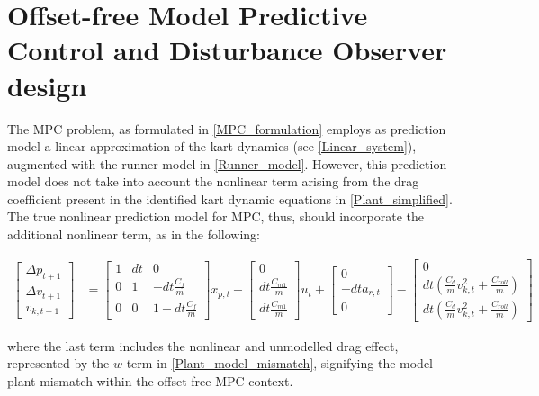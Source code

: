 \documentclass[a4paper,12pt,oneside]{book}
\begin{document}
\section{Offset-free Model Predictive Control and Disturbance Observer design}
The MPC problem, as formulated in \eqref{MPC_formulation} employs as prediction model a linear approximation of the kart dynamics (see \eqref{Linear_system}), augmented with the runner model in \eqref{Runner_model}.
However, this prediction model does not take into account the nonlinear term arising from the drag coefficient present in the identified kart dynamic equations in \ref{Plant_simplified}.
The true nonlinear prediction model for MPC, thus, should incorporate the additional nonlinear term, as in the following:

\begin{equation}
\begin{aligned}
    \begin{bmatrix}
        \Delta p_{t+1}  \\
        \Delta v_{t+1} \\
        v_{k,t+1}
    \end{bmatrix}
    & =
    \begin{bmatrix}
        1 & dt & 0 \\
        0 & 1 & -dt\frac{C_f}{m} \\
        0 & 0 & 1-dt\frac{C_f}{m}
    \end{bmatrix}
    x_{p,t}
    +
    \begin{bmatrix}
        0 \\
        dt \frac{C_{m1}}{m} \\
        dt \frac{C_{m1}}{m}
    \end{bmatrix}
    u_t + 
    \begin{bmatrix}
    0 \\
    - dt a_{r,t} \\
    0
    \end{bmatrix} 
    -
    \begin{bmatrix}
    0 \\
    dt (\frac{C_{d}}{m} v_{k,t}^2+ \frac{C_{roll}}{m}) \\
    dt (\frac{C_{d}}{m} v_{k,t}^2+ \frac{C_{roll}}{m})
    \end{bmatrix}
\end{aligned}
\label{Non-lin_prediction_model_MPC}
\end{equation}

where the last term includes the nonlinear and unmodelled drag effect, represented by the $w$ term in \eqref{Plant_model_mismatch},  signifying the model-plant mismatch within the offset-free MPC context.
\end{document}
